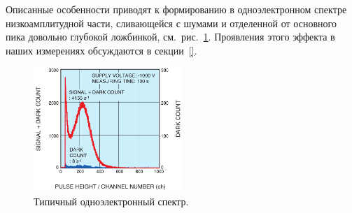 Описанные особенности приводят к формированию в одноэлектронном спектре низкоамплитудной части, сливающейся с шумами и отделенной от основного пика довольно глубокой ложбинкой, см.~рис.~\ref{fig:SPEspectrum}. Проявления этого эффекта в наших измерениях обсуждаются в секции~\ref{}.

\begin{figure}
\includegraphics[width=0.5\textwidth]{pictures/3_Typical_spectrum_from_H12700.png}
\caption{Типичный одноэлектронный спектр.}
\label{fig:SPEspectrum}
\end{figure}
